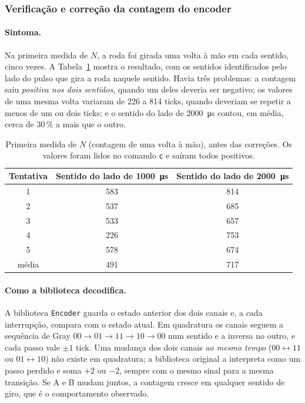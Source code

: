 \documentclass[12pt]{article}
\begin{document}
\subsubsection{Verificação e correção da contagem do encoder}
\label{sec:correcao_encoder}

\paragraph{Sintoma.} Na primeira medida de $N$, a roda foi girada uma volta à mão em cada sentido, cinco vezes. A Tabela~\ref{tab:n_inicial} mostra o resultado, com os sentidos identificados pelo lado do pulso que gira a roda naquele sentido. Havia três problemas: a contagem saiu \emph{positiva nos dois sentidos}, quando um deles deveria ser negativo; os valores de uma mesma volta variaram de 226 a 814 ticks, quando deveriam se repetir a menos de um ou dois ticks; e o sentido do lado de \SI{2000}{\micro\second} contou, em média, cerca de 30\,\% a mais que o outro.

\begin{table}[H]
  \centering
  \caption{Primeira medida de $N$ (contagem de uma volta à mão), antes das correções. Os valores foram lidos no comando \texttt{c} e saíram todos positivos.}
  \label{tab:n_inicial}
  \begin{tabular}{ccc}
    \toprule
    Tentativa & Sentido do lado de \SI{1000}{\micro\second} & Sentido do lado de \SI{2000}{\micro\second} \\
    \midrule
    1 & 583 & 814 \\
    2 & 537 & 685 \\
    3 & 533 & 657 \\
    4 & 226 & 753 \\
    5 & 578 & 674 \\
    \midrule
    média & 491 & 717 \\
    \bottomrule
  \end{tabular}
\end{table}

\paragraph{Como a biblioteca decodifica.} A biblioteca \texttt{Encoder} guarda o estado anterior dos dois canais e, a cada interrupção, compara com o estado atual. Em quadratura os canais seguem a sequência de Gray $00 \to 01 \to 11 \to 10 \to 00$ num sentido e a inversa no outro, e cada passo vale $\pm 1$ tick. Uma mudança dos dois canais \emph{ao mesmo tempo} ($00 \leftrightarrow 11$ ou $01 \leftrightarrow 10$) não existe em quadratura; a biblioteca original a interpreta como um passo perdido e soma $+2$ ou $-2$, sempre com o mesmo sinal para a mesma transição. Se A e B mudam juntos, a contagem cresce em qualquer sentido de giro, que é o comportamento observado.
\end{document}
